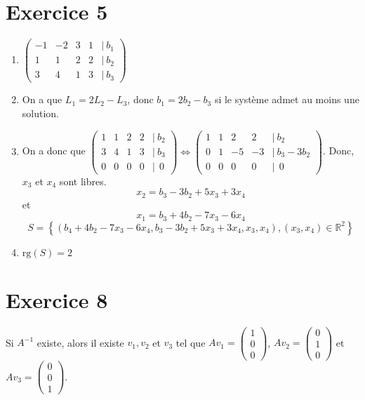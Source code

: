 \documentclass[a4paper, titlepage]{article}
\begin{document}
	\section*{Exercice 5}
	\begin{enumerate}
		\item $\begin{pmatrix} -1&-2&3&1&|~b_1\\1&1&2&2&|~b_2\\3&4&1&3&|~b_3 \end{pmatrix} $
		\item On a que $L_1 = 2L_2-L_3$, donc $b_1=2b_2-b_3$ si le système admet au moins une solution.
		\item On a donc que $\begin{pmatrix} 1&1&2&2&|~b_2\\3&4&1&3&|~b_3\\0&0&0&0&|~~0 \end{pmatrix}\iff \begin{pmatrix} 1&1&2&2&|~b_2\\0&1&-5&-3&|~b_3-3b_2\\0&0&0&0&|~~0 \end{pmatrix} $. Donc, $x_3$ et $x_4$ sont libres.
			$$x_2 = b_3-3b_2+5x_3+3x_4$$
			et
			$$ x_1 = b_3+4b_2-7x_3-6x_4 $$
			$$ S = \left\{ (b_4+4b_2-7x_3-6x_4,b_3-3b_2+5x_3+3x_4,x_3,x_4), (x_3,x_4)\in\mathbb{R}^2 \right\}  $$
		\item $\mathrm{rg}(S) = 2$
	\end{enumerate}
	\section*{Exercice 8}
	Si $A^{-1}$ existe, alors il existe $v_1,v_2$ et $v_3$ tel que $Av_1 = \begin{pmatrix} 1\\0\\0 \end{pmatrix}$, $Av_2 = \begin{pmatrix} 0\\1\\0 \end{pmatrix}$ et $Av_3 = \begin{pmatrix} 0\\0\\1 \end{pmatrix}$.
\end{document}
